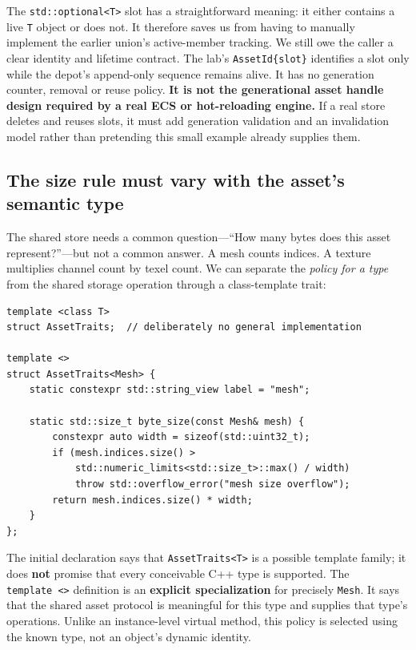 The \texttt{std::optional\textless{}T\textgreater{}} slot has a straightforward meaning: it either contains a live \texttt{T} object or does not. It therefore saves us from having to manually implement the earlier union's active-member tracking. We still owe the caller a clear identity and lifetime contract. The lab's \texttt{AssetId\{slot\}} identifies a slot only while the depot's append-only sequence remains alive. It has no generation counter, removal or reuse policy. \textbf{It is not the generational asset handle design required by a real ECS or hot-reloading engine.} If a real store deletes and reuses slots, it must add generation validation and an invalidation model rather than pretending this small example already supplies them.

\subsection{The size rule must vary with the asset's semantic type}\label{01-foundations-i-ch005-the-size-rule-must-vary-with-the-assets-semantic-type}

The shared store needs a common question---``How many bytes does this asset represent?''---but not a common answer. A mesh counts indices. A texture multiplies channel count by texel count. We can separate the \emph{policy for a type} from the shared storage operation through a class-template trait:

\begin{verbatim}
template <class T>
struct AssetTraits;  // deliberately no general implementation

template <>
struct AssetTraits<Mesh> {
    static constexpr std::string_view label = "mesh";

    static std::size_t byte_size(const Mesh& mesh) {
        constexpr auto width = sizeof(std::uint32_t);
        if (mesh.indices.size() >
            std::numeric_limits<std::size_t>::max() / width)
            throw std::overflow_error("mesh size overflow");
        return mesh.indices.size() * width;
    }
};
\end{verbatim}

The initial declaration says that \texttt{AssetTraits\textless{}T\textgreater{}} is a possible template family; it does \textbf{not} promise that every conceivable C++ type is supported. The \texttt{template\ \textless{}\textgreater{}} definition is an \textbf{explicit specialization} for precisely \texttt{Mesh}. It says that the shared asset protocol is meaningful for this type and supplies that type's operations. Unlike an instance-level virtual method, this policy is selected using the known type, not an object's dynamic identity.

